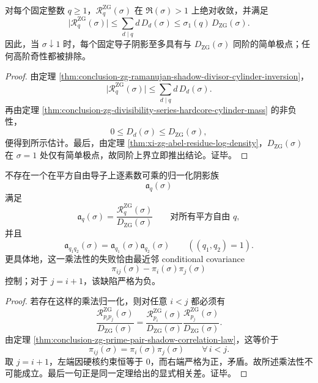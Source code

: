 \begin{proposition}\label{prop:conclusion-zg-fixed-conductor-shadow-pole-rigidity}
对每个固定整数 \(q\ge 1\)，\(\mathcal R_q^{\mathrm{ZG}}(\sigma)\) 在 \(\Re(\sigma)>1\) 上绝对收敛，并满足
\[
\bigl|\mathcal R_q^{\mathrm{ZG}}(\sigma)\bigr|
\le
\sum_{d\mid q}d\,D_d(\sigma)
\le
\sigma_1(q)\,D_{\mathrm{ZG}}(\sigma).
\]
因此，当 \(\sigma\downarrow 1\) 时，每个固定导子阴影至多具有与 \(D_{\mathrm{ZG}}(\sigma)\) 同阶的简单极点；任何高阶奇性都被排除。
\end{proposition}
\begin{proof}
由定理 \ref{thm:conclusion-zg-ramanujan-shadow-divisor-cylinder-inversion}，
\[
\bigl|\mathcal R_q^{\mathrm{ZG}}(\sigma)\bigr|
\le
\sum_{d\mid q}d\,D_d(\sigma).
\]
再由定理 \ref{thm:conclusion-zg-divisibility-series-hardcore-cylinder-mass} 的非负性，
\[
0\le D_d(\sigma)\le D_{\mathrm{ZG}}(\sigma),
\]
便得到所示估计。最后，由定理 \ref{thm:xi-zg-abel-residue-log-density}，\(D_{\mathrm{ZG}}(\sigma)\) 在 \(\sigma=1\) 处仅有简单极点，故同阶上界立即推出结论。证毕。
\end{proof}

\begin{theorem}\label{thm:conclusion-zg-shadow-nonmultiplicativity-nearest-neighbor}
不存在一个在平方自由导子上逐素数可乘的归一化阴影族
\[
\mathfrak a_q(\sigma)
\]
满足
\[
\mathfrak a_q(\sigma)=\frac{\mathcal R_q^{\mathrm{ZG}}(\sigma)}{D_{\mathrm{ZG}}(\sigma)}
\qquad
\text{对所有平方自由 }q,
\]
并且
\[
\mathfrak a_{q_1q_2}(\sigma)=\mathfrak a_{q_1}(\sigma)\mathfrak a_{q_2}(\sigma)
\qquad
((q_1,q_2)=1).
\]
更具体地，这一乘法性的失败恰由最近邻 conditional covariance
\[
\pi_{ij}(\sigma)-\pi_i(\sigma)\pi_j(\sigma)
\]
控制；对于 \(j=i+1\)，该缺陷严格为负。
\end{theorem}
\begin{proof}
若存在这样的乘法归一化，则对任意 \(i<j\) 都必须有
\[
\frac{\mathcal R_{p_ip_j}^{\mathrm{ZG}}(\sigma)}{D_{\mathrm{ZG}}(\sigma)}
=
\frac{\mathcal R_{p_i}^{\mathrm{ZG}}(\sigma)}{D_{\mathrm{ZG}}(\sigma)}
\frac{\mathcal R_{p_j}^{\mathrm{ZG}}(\sigma)}{D_{\mathrm{ZG}}(\sigma)}.
\]
由定理 \ref{thm:conclusion-zg-prime-pair-shadow-correlation-law}，这等价于
\[
\pi_{ij}(\sigma)=\pi_i(\sigma)\pi_j(\sigma)
\qquad
\forall\, i<j.
\]
取 \(j=i+1\)，左端因硬核约束恒等于 \(0\)，而右端严格为正，矛盾。故所述乘法性不可能成立。最后一句正是同一定理给出的显式相关差。证毕。
\end{proof}

